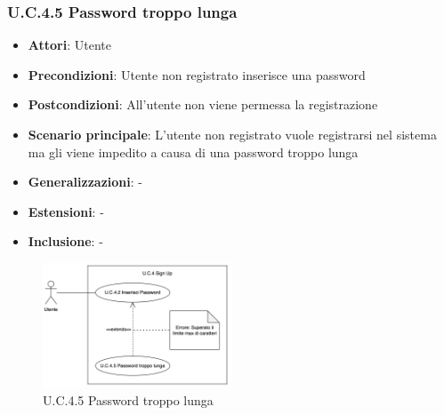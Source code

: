 \subsubsection{U.C.4.5 Password troppo lunga}
\begin{itemize}
    \item \textbf{Attori}: Utente
    \item \textbf{Precondizioni}: Utente non registrato inserisce una password
    \item \textbf{Postcondizioni}: All'utente non viene permessa la registrazione
    \item \textbf{Scenario principale}: L’utente non registrato vuole registrarsi nel sistema ma gli viene impedito a causa di una password troppo lunga
    \item \textbf{Generalizzazioni}: -
    \item \textbf{Estensioni}: -
    \item \textbf{Inclusione}: -
\end{itemize}
\begin{figure}[H]
    \centering
    \includegraphics[width=0.5\textwidth]{img/UC4-5.png}
    \caption{U.C.4.5 Password troppo lunga}
\end{figure}
